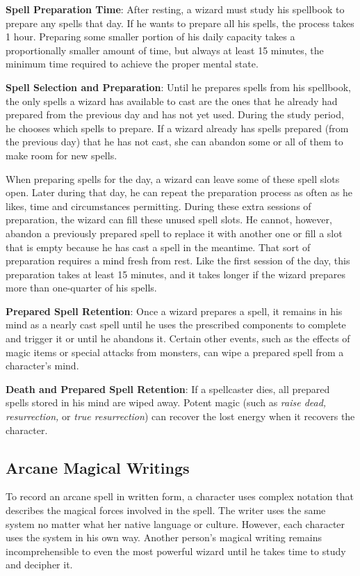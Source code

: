 \textbf{Spell Preparation Time}: After resting, a wizard must study his spellbook to prepare any spells that day. If he wants to prepare all his spells, the process takes 1 hour. Preparing some smaller portion of his daily capacity takes a proportionally smaller amount of time, but always at least 15 minutes, the minimum time required to achieve the proper mental state.
				
\textbf{Spell Selection and Preparation}: Until he prepares spells from his spellbook, the only spells a wizard has available to cast are the ones that he already had prepared from the previous day and has not yet used. During the study period, he chooses which spells to prepare. If a wizard already has spells prepared (from the previous day) that he has not cast, she can abandon some or all of them to make room for new spells.
				
When preparing spells for the day, a wizard can leave some of these spell slots open. Later during that day, he can repeat the preparation process as often as he likes, time and circumstances permitting. During these extra sessions of preparation, the wizard can fill these unused spell slots. He cannot, however, abandon a previously prepared spell to replace it with another one or fill a slot that is empty because he has cast a spell in the meantime. That sort of preparation requires a mind fresh from rest. Like the first session of the day, this preparation takes at least 15 minutes, and it takes longer if the wizard prepares more than one-quarter of his spells.
				
\textbf{Prepared Spell Retention}: Once a wizard prepares a spell, it remains in his mind as a nearly cast spell until he uses the prescribed components to complete and trigger it or until he abandons it. Certain other events, such as the effects of magic items or special attacks from monsters, can wipe a prepared spell from a character's mind.
				
\textbf{Death and Prepared Spell Retention}: If a spellcaster dies, all prepared spells stored in his mind are wiped away. Potent magic (such as \textit{raise dead, resurrection, }or \textit{true resurrection}) can recover the lost energy when it recovers the character.
				
\subsection{Arcane Magical Writings}

				
To record an arcane spell in written form, a character uses complex notation that describes the magical forces involved in the spell. The writer uses the same system no matter what her native language or culture. However, each character uses the system in his own way. Another person's magical writing remains incomprehensible to even the most powerful wizard until he takes time to study and decipher it.
				
